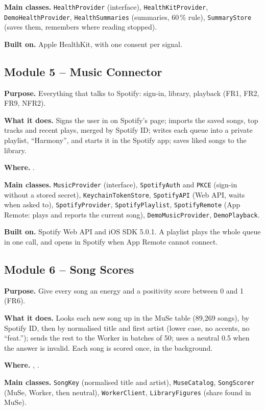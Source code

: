 \documentclass[conference]{IEEEtran}
\newcommand{\field}[1]{\noindent\textbf{#1}}
\begin{document}
\field{Main classes.} \texttt{HealthProvider} (interface), \texttt{HealthKitProvider}, \texttt{DemoHealthProvider}, \texttt{HealthSummaries} (summaries, 60\,\% rule), \texttt{SummaryStore} (saves them, remembers where reading stopped).

\field{Built on.} Apple HealthKit, with one consent per signal.

\subsection{Module 5 -- Music Connector}
\field{Purpose.} Everything that talks to Spotify: sign-in, library, playback (FR1, FR2, FR9, NFR2).

\field{What it does.} Signs the user in on Spotify's page; imports the saved songs, top tracks and recent plays, merged by Spotify ID; writes each queue into a private playlist, ``Harmony'', and starts it in the Spotify app; saves liked songs to the library.

\field{Where.} .

\field{Main classes.} \texttt{MusicProvider} (interface), \texttt{SpotifyAuth} and \texttt{PKCE} (sign-in without a stored secret), \texttt{KeychainTokenStore}, \texttt{SpotifyAPI} (Web API, waits when asked to), \texttt{SpotifyProvider}, \texttt{SpotifyPlaylist}, \texttt{SpotifyRemote} (App Remote: plays and reports the current song), \texttt{DemoMusicProvider}, \texttt{DemoPlayback}.

\field{Built on.} Spotify Web API and iOS SDK 5.0.1. A playlist plays the whole queue in one call, and opens in Spotify when App Remote cannot connect.

\subsection{Module 6 -- Song Scores}
\field{Purpose.} Give every song an energy and a positivity score between 0 and 1 (FR6).

\field{What it does.} Looks each new song up in the MuSe table (89,269 songs), by Spotify ID, then by normalised title and first artist (lower case, no accents, no ``feat.''); sends the rest to the Worker in batches of 50; uses a neutral 0.5 when the answer is invalid. Each song is scored once, in the background.

\field{Where.} , .

\field{Main classes.} \texttt{SongKey} (normalised title and artist), \texttt{MuseCatalog}, \texttt{SongScorer} (MuSe, Worker, then neutral), \texttt{WorkerClient}, \texttt{LibraryFigures} (share found in MuSe).
\end{document}
